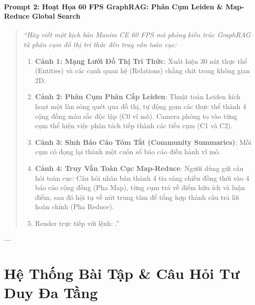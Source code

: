 \begin{simulationbox}
\paragraph{Prompt 2: Hoạt Họa 60 FPS GraphRAG: Phân Cụm Leiden \& Map-Reduce Global Search}
\begin{quote}\small\itshape
``Hãy viết một kịch bản Manim CE 60 FPS mô phỏng kiến trúc GraphRAG từ phân cụm đồ thị tri thức đến truy vấn toàn cục:
\begin{enumerate}
  \item \textbf{Cảnh 1: Mạng Lưới Đồ Thị Tri Thức}: Xuất hiện 30 nút thực thể (Entities) và các cạnh quan hệ (Relations) chằng chit trong không gian 2D.
  \item \textbf{Cảnh 2: Phân Cụm Phân Cấp Leiden}: Thuật toán Leiden kích hoạt một làn sóng quét qua đồ thị, tự động gom các thực thể thành 4 cộng đồng màu sắc độc lập (C0 vĩ mô). Camera phóng to vào từng cụm thể hiện việc phân tách tiếp thành các tiểu cụm (C1 và C2).
  \item \textbf{Cảnh 3: Sinh Báo Cáo Tóm Tắt (Community Summaries)}: Mỗi cụm cô đọng lại thành một cuốn sổ báo cáo điều hành vĩ mô.
  \item \textbf{Cảnh 4: Truy Vấn Toàn Cục Map-Reduce}: Người dùng gửi câu hỏi toàn cục: Câu hỏi nhân bản thành 4 tia sáng chiếu đồng thời vào 4 báo cáo cộng đồng (Pha Map), từng cụm trả về điểm hữu ích và luận điểm, sau đó hội tụ về nút trung tâm để tổng hợp thành câu trả lời hoàn chỉnh (Pha Reduce).
  \item Render trực tiếp với lệnh: .''
\end{enumerate}
\end{quote}
\end{simulationbox}

---

\section{Hệ Thống Bài Tập \& Câu Hỏi Tư Duy Đa Tầng}
\label{sec:ch08-exercises}

